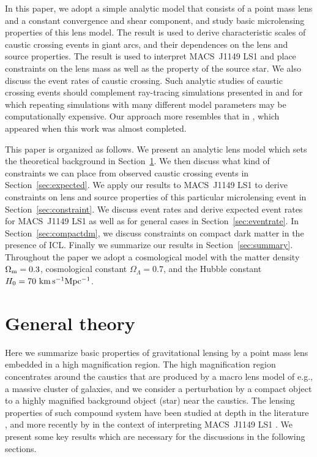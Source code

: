 \documentclass[showpacs,twocolumn,preprintnumbers,amsmath,amssymb,superscriptaddress,nofootinbib]{revtex4}
\begin{document}
In this paper, we adopt a simple analytic model that consists of
a point mass lens and a constant convergence and shear component, and
study basic microlensing properties of this lens model. The result is
used to derive characteristic scales of caustic crossing events in
giant arcs, and their dependences on the lens and source properties. 
The result is used to interpret MACS~J1149 LS1 and place constraints
on the lens mass as well as the property of the source star. We also
discuss the event rates of caustic crossing. Such analytic studies of
caustic crossing events should complement ray-tracing simulations
presented in \cite{Kelly:2017fps} and \cite{Diego:2017drh} for which
repeating simulations with many different model parameters may be
computationally expensive. Our approach more resembles that in
\cite{Venumadhav:2017pps}, which appeared when this work was almost
completed. 

This paper is organized as follows. We present an analytic lens model
which sets the theoretical background in Section~\ref{sec:general}.
We then discuss what kind of constraints we can place from observed
caustic crossing events in Section~\ref{sec:expected}.
We apply our results to MACS~J1149 LS1 to derive constraints on lens
and source properties of this particular microlensing event in
Section~\ref{sec:constraint}. We discuss event rates and derive
expected event rates for MACS~J1149 LS1 as well as for general cases
in Section~\ref{sec:eventrate}. In Section~\ref{sec:compactdm}, 
we discuss constraints on compact dark matter in the presence of ICL. 
Finally we summarize our results in Section~\ref{sec:summary}. 
Throughout the paper we adopt a cosmological model with the matter
density $\Omega_{\rm m}=0.3$, cosmological constant $\Omega_\Lambda=0.7$, 
and the Hubble constant $H_0=70~{\rm km\,s^{-1}Mpc^{-1}}$. 

\section{General theory}
\label{sec:general}

Here we summarize basic properties of gravitational lensing by a point
mass lens embedded in a high magnification region. The high
magnification region concentrates around the caustics that are
produced by a macro lens model of e.g., a massive cluster of galaxies,
and we consider a perturbation by a compact object to a highly
magnified background object (star) near the caustics. The lensing
properties of such compound system have been studied at depth in the
literature
\cite{Chang:1979zz,Paczynski:1986aa,Kayser:1986aa,Witt:1990aa,Schechter:2002dm},
and more recently by \cite{Diego:2017drh,Venumadhav:2017pps} in the
context of interpreting MACS~J1149 LS1 \cite{Kelly:2017fps}. We
present some key results which are necessary for the discussions in
the following sections. 
\end{document}
